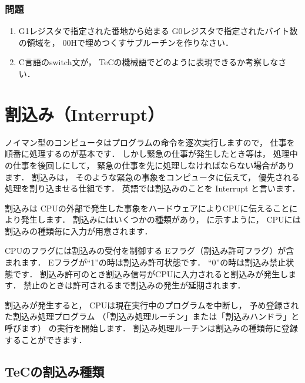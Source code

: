 \vfill
\subsubsection{問題}
\begin{enumerate}
\item G1レジスタで指定された番地から始まる
G0レジスタで指定されたバイト数の領域を，
00Hで埋めつくすサブルーチンを作りなさい．
\item C言語のswitch文が，
TeCの機械語でどのように表現できるか考察しなさい．
\end{enumerate}
\vfill

\newpage
\section{割込み（Interrupt）}
\label{chap6:interrupt}

ノイマン型のコンピュータはプログラムの命令を逐次実行しますので，
仕事を順番に処理するのが基本です．
しかし緊急の仕事が発生したとき等は，
処理中の仕事を後回しにして，
緊急の仕事を先に処理しなければならない場合があります．
割込みは，
そのような緊急の事象をコンピュータに伝えて，
優先される処理を割り込ませる仕組です．
英語では割込みのことを Interrupt と言います．

割込みは
CPUの外部で発生した事象をハードウェアによりCPUに伝えることにより発生します．
割込みにはいくつかの種類があり，
に示すように，
CPUには割込みの種類毎に入力が用意されます．

CPUのフラグには割込みの受付を制御する
Eフラグ（割込み許可フラグ）が含まれます．
Eフラグが``1''の時は割込み許可状態です．
``0''の時は割込み禁止状態です．
割込み許可のとき割込み信号がCPUに入力されると割込みが発生します．
禁止のときは許可されるまで割込みの発生が延期されます．

割込みが発生すると，
CPUは現在実行中のプログラムを中断し，
予め登録された割込み処理プログラム
（「割込み処理ルーチン」または「割込みハンドラ」と呼びます）
の実行を開始します．
割込み処理ルーチンは割込みの種類毎に登録することができます．


\subsection{TeCの割込み種類}

